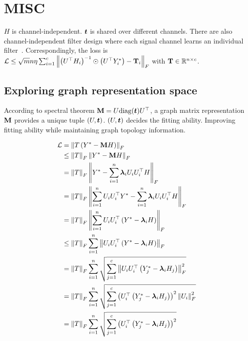 \documentclass{article} %
\def\vlambda{{\bm\lambda}}
\begin{document}
\section{MISC}

$H$ is channel-independent.
${\bm{t}}$ is shared over different channels.
There are also channel-independent filter design where each signal channel learns an individual filter~\citep{yang2022spectrum,JacobiConv,bo2022specformer}.
Correspondingly, the loss is ${\mathcal{L}}\leq\sqrt{m}n\eta\sum_{i=1}^c\left\|\left(U^{\top}H_i\right)^{-1}\odot\left(U^{\top}Y^*_i\right)-{\mathbf{T}}_i\right\|_F$ with ${\mathbf{T}}\in{\mathbb{R}}^{n\times c}$.

\subsection{Exploring graph representation space}
According to spectral theorem ${\mathbf{M}}=U\mathrm{diag}({\bm{t}})U^{\top}$, a graph matrix representation ${\mathbf{M}}$ provides a unique tuple $(U,{\bm{t}})$.
$(U,{\bm{t}})$ decides the fitting ability.
Improving fitting ability while maintaining graph topology information.

\begin{equation}
	\begin{aligned}
		\gL&=\left\|T\left(Y^*-\rmM H\right)\right\|_F\\
		&\leq\left\|T\right\|_F\left\|Y^*-\rmM H\right\|_F\\
		&=\left\|T\right\|_F\left\|Y^*-\sum_{i=1}^n\vlambda_iU_iU_i^{\top}H\right\|_F\\
		&=\left\|T\right\|_F\left\|\sum_{i=1}^nU_iU_i^{\top}Y^*-\sum_{i=1}^n\vlambda_iU_iU_i^{\top}H\right\|_F\\
		&=\left\|T\right\|_F\left\|\sum_{i=1}^nU_iU_i^{\top}\left(Y^*-\vlambda_iH\right)\right\|_F\\
		&\leq\left\|T\right\|_F\sum_{i=1}^n\left\|U_iU_i^{\top}\left(Y^*-\vlambda_iH\right)\right\|_F\\
		&=\left\|T\right\|_F\sum_{i=1}^n\sqrt{\sum_{j=1}^c\left\|U_iU_i^{\top}\left(Y^*_j-\vlambda_iH_j\right)\right\|^2_F}\\
		&=\left\|T\right\|_F\sum_{i=1}^n\sqrt{\sum_{j=1}^c\left(U_i^{\top}\left(Y^*_j-\vlambda_iH_j\right)\right)^2\left\|U_i\right\|^2_F}\\
		&=\left\|T\right\|_F\sum_{i=1}^n\sqrt{\sum_{j=1}^c\left(U_i^{\top}\left(Y^*_j-\vlambda_iH_j\right)\right)^2}
	\end{aligned}
\end{equation}
\end{document}

